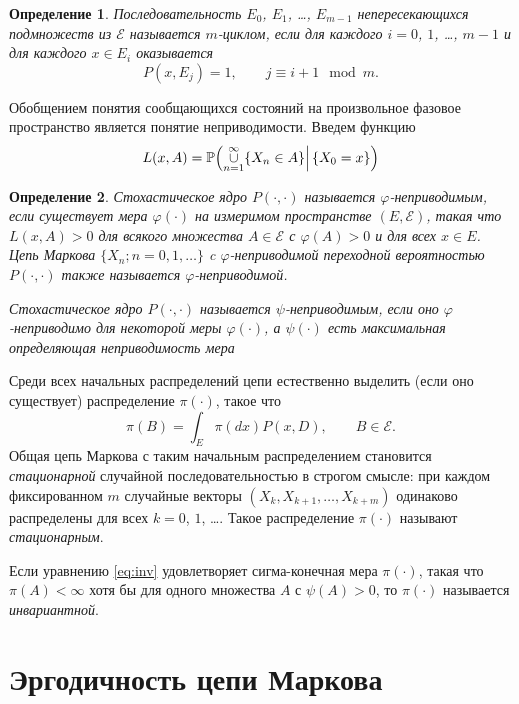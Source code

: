 \documentclass[14pt]{extarticle}
\newtheorem{definition}{Определение}
\renewcommand{\Pr}{\mathbb P}
\begin{document}
\begin{definition}
  Последовательность $E_0$, $E_1$, \ldots, $E_{m-1}$ непересекающихся
  подмножеств из $\mathcal E$
  называется {\emph{$m$-циклом}}, если для
  каждого $i=0$, $1$, \ldots, $m-1$ и для каждого $x\in E_i$ оказывается
  \[
  P(x,E_j)=1, \qquad j\equiv i+1 \mod m.
  \]
\end{definition}


Обобщением понятия сообщающихся состояний на произвольное фазовое пространство
является понятие неприводимости. Введем функцию
\[
L(x,A)=\Pr\Bigl(\mathop{\cup}_{n=1}^\infty \{X_n\in A\}\Big|\,\{X_0=x\}\Bigr)
\]

\begin{definition}\label{AZ:def:irreducible} \sloppy
  Стохастическое ядро $P(\cdot,\cdot)$ называется
  {\emph{$\varphi$-не\-при\-во\-димым}}, если существует мера $\varphi(\cdot)$
  на измеримом пространстве $(E,\mathcal E)$, такая что $L(x,A)>0$ для всякого
  множества $A\in\mathcal E$ с $\varphi(A)>0$ и для всех $x\in E$. Цепь Маркова
  $\{X_n; n=0, 1, \ldots\}$ c $\varphi$-неприводимой переходной вероятностью
  $P(\cdot, \cdot)$ также называется $\varphi$-неприводимой.

  Стохастическое ядро $P(\cdot, \cdot)$ называется $\psi$-неприводимым, если оно
  $\varphi$-неприводимо для некоторой меры $\varphi(\cdot)$, а $\psi(\cdot)$
  есть максимальная определяющая неприводимость мера
\end{definition}

Среди всех начальных распределений цепи естественно выделить (если оно
существует) распределение $\pi(\cdot)$, такое что
\begin{equation}
\label{eq:inv}
\pi(B)=\int_E \pi(dx) P(x,D), \qquad B\in \mathcal E.
\end{equation}
Общая цепь Маркова с таким начальным распределением становится
\emph{стационарной} случайной последовательностью в строгом смысле: при каждом
фиксированном $m$ случайные векторы $(X_k, X_{k+1}, \ldots, X_{k+m})$ одинаково
распределены для всех $k=0$, $1$, \ldots. Такое распределение $\pi(\cdot)$
называют \emph{стационарным}. 

Если уравнению \eqref{eq:inv} удовлетворяет сигма-конечная мера $\pi(\cdot)$,
такая что $\pi(A)<\infty$ хотя бы для одного множества $A$ с $\psi(A)>0$, то
$\pi(\cdot)$ называется \emph{инвариантной}. 

\newpage
\section{Эргодичность цепи Маркова}
\end{document}
